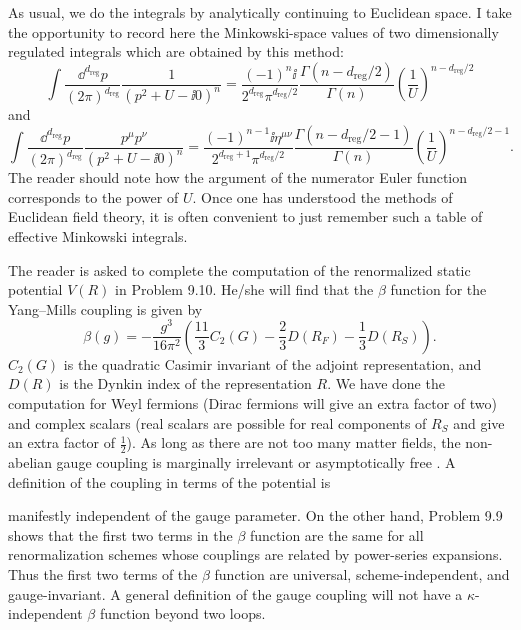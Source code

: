 As usual, we do the integrals by analytically continuing to Euclidean space. I
take the opportunity to record here the Minkowski-space values of two
dimensionally regulated integrals which are obtained by this method:
\[
  \int\frac{\dd^{d_{\mathrm{reg}}}p}{(2\pi)^{d_{\mathrm{reg}}}}
  \frac{1}{(p^2+U-\ii0)^n}
  =\frac{(-1)^n\ii}{2^{d_{\mathrm{reg}}}\pi^{d_{\mathrm{reg}}/2}}
  \frac{\Gamma(n-d_{\mathrm{reg}}/2)}{\Gamma(n)}
  \left(\frac{1}{U}\right)^{n-d_{\mathrm{reg}}/2}
\]
and
\[
  \int\frac{\dd^{d_{\mathrm{reg}}}p}{(2\pi)^{d_{\mathrm{reg}}}}
  \frac{p^\mu p^\nu}{(p^2+U-\ii0)^n}
  =\frac{(-1)^{n-1}\ii\eta^{\mu\nu}}{2^{d_{\mathrm{reg}}+1}\pi^{d_{\mathrm{reg}}/2}}
  \frac{\Gamma(n-d_{\mathrm{reg}}/2-1)}{\Gamma(n)}
  \left(\frac{1}{U}\right)^{n-d_{\mathrm{reg}}/2-1}.
\]
The reader should note how the argument of the numerator Euler function
corresponds to the power of $U$. Once one has understood the methods of
Euclidean field theory, it is often convenient to just remember such a table of
effective Minkowski integrals.


The reader is asked to complete the computation of the renormalized static
potential $V(R)$ in Problem 9.10. He/she will find that the $\beta$ function for
the Yang--Mills coupling is given by
\[
  \beta(g)=-\frac{g^3}{16\pi^2}
  \left(\frac{11}{3}C_2(G)-\frac{2}{3}D(R_F)-\frac{1}{3}D(R_S)\right).
\]
$C_2(G)$ is the quadratic Casimir invariant of the adjoint representation, and
$D(R)$ is the Dynkin index of the representation $R$. We have done the
computation for Weyl fermions (Dirac fermions will give an extra factor of two)
and complex scalars (real scalars are possible for real components of $R_S$ and
give an extra factor of $\tfrac12$). As long as there are not too many matter
fields, the non-abelian gauge coupling is marginally irrelevant or
asymptotically free \cite{banks-ref-113,banks-ref-114,banks-ref-115,banks-ref-116,banks-ref-117,banks-ref-118}.
A definition of the coupling in terms of the potential is

manifestly independent of the gauge parameter. On the other hand, Problem 9.9
shows that the first two terms in the $\beta$ function are the same for all
renormalization schemes whose couplings are related by power-series expansions.
Thus the first two terms of the $\beta$ function are universal,
scheme-independent, and gauge-invariant. A general definition of the gauge
coupling will not have a $\kappa$-independent $\beta$ function beyond two loops.

